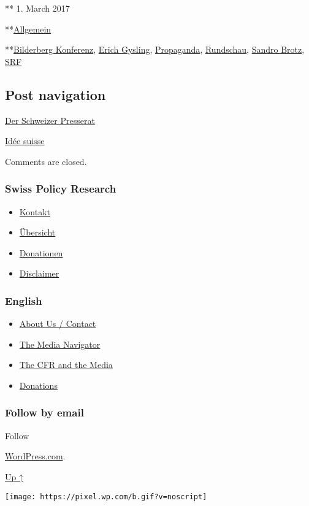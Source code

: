 ** 1. March 2017

**\href{https://swprs.org/category/allgemein/}{Allgemein}

**\href{https://swprs.org/tag/bilderberg-konferenz/}{Bilderberg
Konferenz}, \href{https://swprs.org/tag/erich-gysling/}{Erich Gysling},
\href{https://swprs.org/tag/propaganda/}{Propaganda},
\href{https://swprs.org/tag/rundschau/}{Rundschau},
\href{https://swprs.org/tag/sandro-brotz/}{Sandro Brotz},
\href{https://swprs.org/tag/srf/}{SRF}

\hypertarget{post-navigation}{%
\subsection{Post navigation}\label{post-navigation}}

\href{https://swprs.org/2017/03/01/der-schweizer-presserat/}{Der
Schweizer Presserat}

\href{https://swprs.org/2017/03/01/srg-idee-suisse/}{Idée suisse}

Comments are closed.

\hypertarget{swiss-policy-research}{%
\subsubsection{Swiss Policy Research}\label{swiss-policy-research}}

\begin{itemize}
\tightlist
\item
  \href{https://swprs.org/kontakt/}{Kontakt}
\item
  \href{https://swprs.org/uebersicht/}{Übersicht}
\item
  \href{https://swprs.org/donationen/}{Donationen}
\item
  \href{https://swprs.org/disclaimer/}{Disclaimer}
\end{itemize}

\hypertarget{english}{%
\subsubsection{English}\label{english}}

\begin{itemize}
\tightlist
\item
  \href{https://swprs.org/contact/}{About Us / Contact}
\item
  \href{https://swprs.org/media-navigator/}{The Media Navigator}
\item
  \href{https://swprs.org/the-american-empire-and-its-media/}{The CFR
  and the Media}
\item
  \href{https://swprs.org/donations/}{Donations}
\end{itemize}

\hypertarget{follow-by-email}{%
\subsubsection{Follow by email}\label{follow-by-email}}

Follow

\href{https://wordpress.com/?ref=footer_custom_com}{WordPress.com}.

\protect\hyperlink{}{Up ↑}

\texttt{[image: https://pixel.wp.com/b.gif?v=noscript]}
